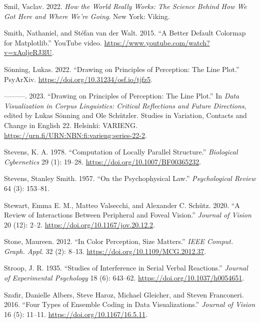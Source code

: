 \documentclass[
  letterpaper,
  DIV=11,
  numbers=noendperiod]{scrreprt}
\newlength{\cslhangindent}
\newenvironment{CSLReferences}[2] %
 {\begin{list}{}{%
  \setlength{\itemindent}{0pt}
  \setlength{\leftmargin}{0pt}
  \setlength{\parsep}{0pt}
  \ifodd #1
   \setlength{\leftmargin}{\cslhangindent}
   \setlength{\itemindent}{-1\cslhangindent}
  \fi
  \setlength{\itemsep}{#2\baselineskip}}}
 {\end{list}}
\begin{document}
\begin{CSLReferences}{1}{0}
Smil, Vaclav. 2022. \emph{How the World Really Works: The Science Behind
How We Got Here and Where We're Going}. New York: Viking.

Smith, Nathaniel, and Stéfan van der Walt. 2015. {``A Better Default
Colormap for Matplotlib.''} YouTube video.
\url{https://www.youtube.com/watch?v=xAoljeRJ3lU}.

Sönning, Lukas. 2022. {``Drawing on Principles of Perception: The Line
Plot.''} PsyArXiv. \url{https://doi.org/10.31234/osf.io/tjfz5}.

---------. 2023. {``Drawing on Principles of Perception: The Line
Plot.''} In \emph{Data Visualization in Corpus Linguistics: Critical
Reflections and Future Directions}, edited by Lukas Sönning and Ole
Schützler. Studies in Variation, Contacts and Change in English 22.
Helsinki: VARIENG. \url{https://urn.fi/URN:NBN:fi:varieng:series-22-2}.

Stevens, K. A. 1978. {``Computation of Locally Parallel Structure.''}
\emph{Biological Cybernetics} 29 (1): 19--28.
\url{https://doi.org/10.1007/BF00365232}.

Stevens, Stanley Smith. 1957. {``On the Psychophysical Law.''}
\emph{Psychological Review} 64 (3): 153--81.

Stewart, Emma E. M., Matteo Valsecchi, and Alexander C. Schütz. 2020.
{``A Review of Interactions Between Peripheral and Foveal Vision.''}
\emph{Journal of Vision} 20 (12): 2--2.
\url{https://doi.org/10.1167/jov.20.12.2}.

Stone, Maureen. 2012. {``In Color Perception, Size Matters.''}
\emph{IEEE Comput. Graph. Appl.} 32 (2): 8--13.
\url{https://doi.org/10.1109/MCG.2012.37}.

Stroop, J. R. 1935. {``Studies of Interference in Serial Verbal
Reactions.''} \emph{Journal of Experimental Psychology} 18 (6): 643--62.
\url{https://doi.org/10.1037/h0054651}.

Szafir, Danielle Albers, Steve Haroz, Michael Gleicher, and Steven
Franconeri. 2016. {``Four Types of Ensemble Coding in Data
Visualizations.''} \emph{Journal of Vision} 16 (5): 11--11.
\url{https://doi.org/10.1167/16.5.11}.


\end{CSLReferences}
\end{document}
